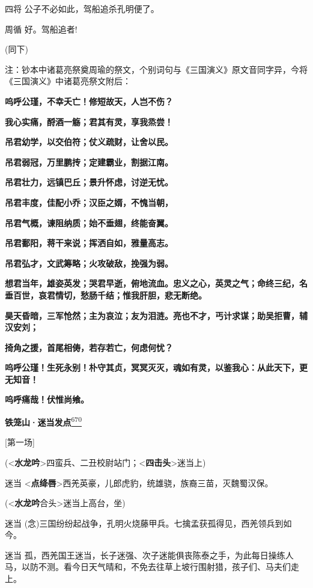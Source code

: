 四将 公子不必如此，驾船追杀孔明便了。

周循 好。驾船追者!

(同下)

注：钞本中诸葛亮祭奠周瑜的祭文，个别词句与《三国演义》原文音同字异，今将《三国演义》中诸葛亮祭文附后：

\textbf{呜呼公瑾，不幸夭亡！修短故天，人岂不伤？}

\textbf{我心实痛，酹酒一觞；君其有灵，享我烝尝！}

\textbf{吊君幼学，以交伯符；仗义疏财，让舍以民。}

\textbf{吊君弱冠，万里鹏抟；定建霸业，割据江南。}

\textbf{吊君壮力，远镇巴丘；景升怀虑，讨逆无忧。}

\textbf{吊君丰度，佳配小乔；汉臣之婿，不愧当朝，}

\textbf{吊君气概，谏阻纳质；始不垂翅，终能奋翼。}

\textbf{吊君鄱阳，蒋干来说；挥洒自如，雅量高志。}

\textbf{吊君弘才，文武筹略；火攻破敌，挽强为弱。}

\textbf{想君当年，雄姿英发；哭君早逝，俯地流血。忠义之心，英灵之气；命终三纪，名垂百世，哀君情切，愁肠千结；惟我肝胆，悲无断绝。}

\textbf{昊天昏暗，三军怆然；主为哀泣；友为泪涟。亮也不才，丐计求谋；助吴拒曹，辅汉安刘；}

\textbf{掎角之援，首尾相俦，若存若亡，何虑何忧？}

\textbf{呜呼公瑾！生死永别！朴守其贞，冥冥灭灭，魂如有灵，以鉴我心：从此天下，更无知音！}

\textbf{呜呼痛哉！伏惟尚飨。}

\newpage
\textbf{铁笼山·迷当发点}\protect\hyperlink{fn670}{\textsuperscript{670}}

{[}第一场{]}

(\textless{}\textbf{水龙吟}\textgreater{}四蛮兵、二丑校尉站门；\textless{}\textbf{四击头}\textgreater{}迷当上)

迷当
\textless{}\textbf{点绛唇}\textgreater{}西羌英豪，儿郎虎豹，统雄骁，族裔三苗，灭魏蜀汉保。

(\textless{}\textbf{水龙吟}合头\textgreater{}迷当上高台，坐)

迷当
(念)三国纷纷起战争，孔明火烧藤甲兵。七擒孟获孤得见，西羌领兵到如今。

迷当
孤，西羌国王迷当，长子迷强、次子迷能俱丧陈泰之手，为此每日操练人马，以防不测。看今日天气晴和，不免去往草上坡行围射猎，孩子们、马夫们走上。

